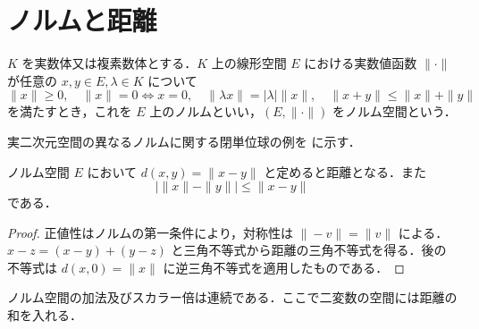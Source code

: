\section{ノルムと距離}
\begin{defn}[ノルム空間]
$K$ を実数体又は複素数体とする．$K$ 上の線形空間 $E$ における実数値函数 $\|\cdot\|$ が任意の $x,y\in E,\lambda\in K$ について
\[
 \|x\|\geq0,\quad \|x\|=0\Leftrightarrow x=0,\quad
 \|\lambda x\|=|\lambda|\|x\|,\quad
 \|x+y\|\leq\|x\|+\|y\|
\]
を満たすとき，これを $E$ 上のノルムといい，$(E,\|\cdot\|)$ をノルム空間という．
\end{defn}
実二次元空間の異なるノルムに関する閉単位球の例を  に示す．
\begin{prop}[ノルムが定める距離]
ノルム空間 $E$ において $d(x,y)=\|x-y\|$ と定めると距離となる．また
\[
 |\|x\|-\|y\||\leq\|x-y\|
\]
である．
\end{prop}
\begin{proof}
正値性はノルムの第一条件により，対称性は $\|-v\|=\|v\|$ による．$x-z=(x-y)+(y-z)$ と三角不等式から距離の三角不等式を得る．後の不等式は $d(x,0)=\|x\|$ に逆三角不等式を適用したものである．
\end{proof}
\begin{prop}[線形演算の連続性]
ノルム空間の加法及びスカラー倍は連続である．ここで二変数の空間には距離の和を入れる．
\end{prop}
